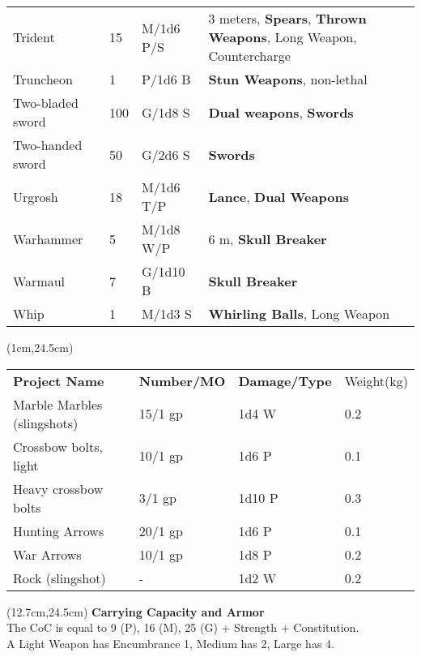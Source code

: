 \documentclass[a4paper,12 pt,openany]{book}
\begin{document}
\begin{textblock*}{19.5cm}
\begin{tabularx}{0.95\textwidth}{llll}
Trident& 15 & M/1d6 P/S& 3 meters, \textbf{Spears}, \textbf{Thrown Weapons}, Long Weapon, Countercharge\\
Truncheon& 1& P/1d6 B& \textbf{Stun Weapons}, non-lethal\\
Two-bladed sword& 100& G/1d8 S& \textbf{Dual weapons}, \textbf{Swords}\\
Two-handed sword& 50 & G/2d6 S&\textbf{Swords}\\
Urgrosh& 18 & M/1d6 T/P& \textbf{Lance}, \textbf{Dual Weapons}\\
Warhammer& 5& M/1d8 W/P& 6 m, \textbf{Skull Breaker}\\
Warmaul& 7& G/1d10 B& \textbf{Skull Breaker}\\
Whip& 1& M/1d3 S& \textbf{Whirling Balls}, Long Weapon\\
\end{tabularx}

\end{textblock*}

\begin{textblock*}{11.5cm}(1cm,24.5cm) %

\begin{tabular}{llll}
\textbf{Project Name} & \textbf{Number/MO} & \textbf{Damage/Type} & Weight(kg) \\
Marble Marbles (slingshots) & 15/1 gp & 1d4 W & 0.2 \\
Crossbow bolts, light & 10/1 gp & 1d6 P & 0.1 \\
Heavy crossbow bolts & 3/1 gp & 1d10 P & 0.3 \\
Hunting Arrows & 20/1 gp & 1d6 P & 0.1 \\
War Arrows & 10/1 gp & 1d8 P & 0.2 \\
Rock (slingshot) & - & 1d2 W & 0.2 \\
\end{tabular}

\end{textblock*}

\begin{textblock*}{8cm}(12.7cm,24.5cm) %
\textbf{Carrying Capacity and Armor}\\
The CoC is equal to 9 (P), 16 (M), 25 (G) + Strength + Constitution.\\
A Light Weapon has Encumbrance 1, Medium has 2, Large has 4.
\end{textblock*}

~\newpage
\end{document}
